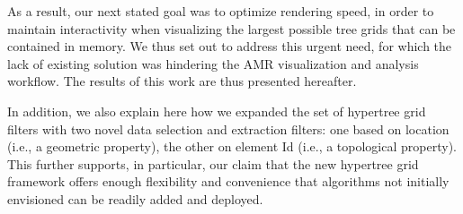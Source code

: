 As a result, our next stated goal was to optimize rendering speed, in
order to maintain interactivity when visualizing the largest
possible tree grids that can be contained in memory.
We thus set out to address this urgent need, for which the lack of
existing solution was hindering the AMR visualization and analysis
workflow.
The results of this work are thus presented hereafter.

In addition, we also explain here how we expanded the set of hypertree
grid filters with two novel data selection and extraction filters: one
based on location (i.e., a geometric property), the other on element
Id (i.e., a topological property).
This further supports, in particular, our claim that the new hypertree
grid framework offers enough flexibility and convenience that
algorithms not initially envisioned can be readily added and deployed.

